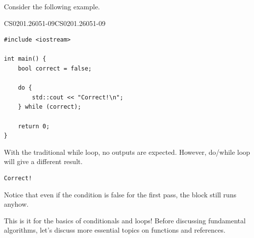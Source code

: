 \documentclass[../../../main.tex]{subfiles}
\begin{document}
Consider the following example.

\begin{cppbox}{CS0201.26051-09}{CS0201.26051-09}
\begin{lstlisting}[style=cppstyle]
#include <iostream>

int main() {
    bool correct = false;

    do {
        std::cout << "Correct!\n";
    } while (correct);

    return 0;
}
\end{lstlisting}
\end{cppbox}

With the traditional while loop, no outputs are expected. However,
do/while loop will give a different result.

\begin{outputbox}
\begin{lstlisting}[style=basic]
Correct!
\end{lstlisting}
\end{outputbox}

Notice that even if the condition is false for the first pass,
the block still runs anyhow.

This is it for the basics of conditionals and loops! Before discussing
fundamental algorithms, let's discuss more essential topics on
functions and references.
\end{document}
